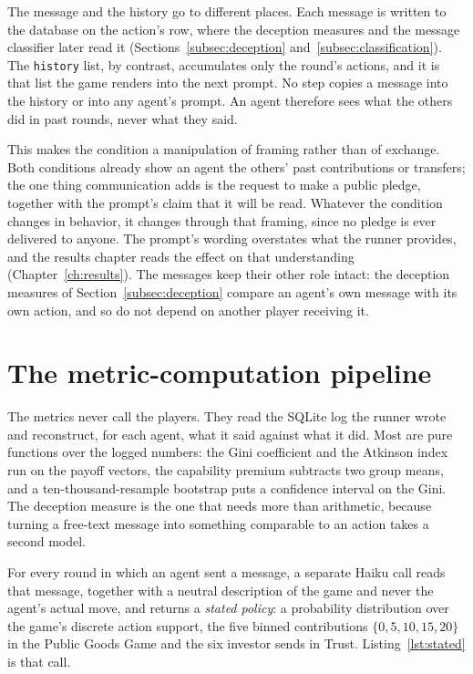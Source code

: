 The message and the history go to different places. Each message is written to the
database on the action's row, where the deception measures and the message
classifier later read it (Sections~\ref{subsec:deception}
and~\ref{subsec:classification}). The \texttt{history} list, by contrast,
accumulates only the round's actions, and it is that list the game renders into
the next prompt. No step copies a message into the history or into any agent's
prompt. An agent therefore sees what the others did in past rounds, never what
they said.

This makes the condition a manipulation of framing rather than of exchange. Both
conditions already show an agent the others' past contributions or transfers; the
one thing communication adds is the request to make a public pledge, together with
the prompt's claim that it will be read. Whatever the condition changes in
behavior, it changes through that framing, since no pledge is ever delivered to
anyone. The prompt's wording overstates what the runner provides, and the results
chapter reads the effect on that understanding (Chapter~\ref{ch:results}). The
messages keep their other role intact: the deception measures of
Section~\ref{subsec:deception} compare an agent's own message with its own action,
and so do not depend on another player receiving it.

\section{The metric-computation pipeline}
\label{sec:metric-pipeline}

The metrics never call the players. They read the SQLite log the runner wrote and
reconstruct, for each agent, what it said against what it did. Most are pure functions
over the logged numbers: the Gini coefficient and the Atkinson index run on the payoff
vectors, the capability premium subtracts two group means, and a ten-thousand-resample
bootstrap puts a confidence interval on the Gini. The deception measure is the one that
needs more than arithmetic, because turning a free-text message into something
comparable to an action takes a second model.

For every round in which an agent sent a message, a separate Haiku call reads that
message, together with a neutral description of the game and never the agent's actual
move, and returns a \emph{stated policy}: a probability distribution over the game's
discrete action support, the five binned contributions \(\{0,5,10,15,20\}\) in the
Public Goods Game and the six investor sends in Trust. Listing~\ref{lst:stated} is that
call.

